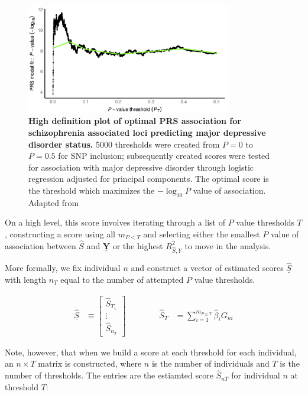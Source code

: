 \begin{figure}[h]
\label{pt}
\centering
\includegraphics[width=0.8\textwidth]{Figures/pt.png}
\caption[Optimal \ac{PRS} construction and interpretation.]{\textbf{High definition plot of optimal \ac{PRS} association for schizophrenia associated loci predicting major depressive disorder status.} 5000 thresholds were created from $P = 0$ to $P=0.5$ for \ac{SNP} inclusion; subsequently created scores were tested for association with major depressive disorder through logistic regression adjusted for principal components. The optimal score is the threshold which maximizes the $-\log_{10} P$ value of association. Adapted from \cite{Euesden2014}}
\end{figure}

On a high level, this score involves iterating through a list of $P$ value thresholds $T$, constructing a score using all $m_{P < T}$ and selecting either the smallest $P$ value of association between $\hat{S}$ and $\underline{\mathbf{Y}}$ or the highest $R^2_{\hat{S}, Y}$ to move in the analysis. 

More formally, we fix individual $n$ and construct a vector of estimated scores $\underline{\hat{S}}$ with length $n_T$ equal to the number of attempted $P$ value thresholds. 

$$ \begin{aligned} \underline{\hat{S}} &\equiv \begin{bmatrix} \hat{S}_{T_1} \\ \vdots \\ \hat{S}_{n_T} \end{bmatrix} &&&&& \hat{S}_T &= \sum^{m_{P \leq T}}_{i=1} \hat{\beta}_i G_{ni} \end{aligned}$$

Note, however, that when we build a score at each threshold for each individual, an $n \times T$ matrix is constructed, where $n$ is the number of individuals and $T$ is the number of thresholds. The entries are the estiamted score $\hat{S}_{nT}$ for individual $n$ at threshold $T$:

